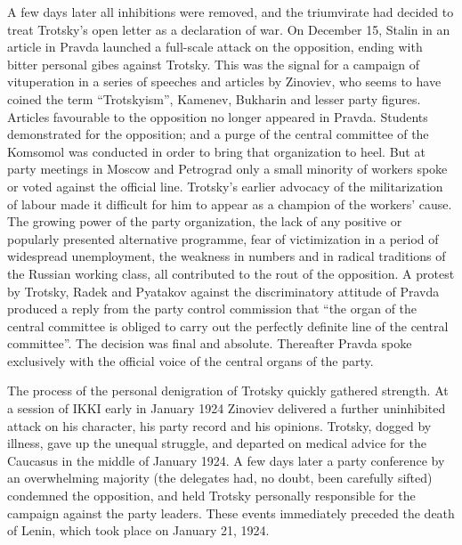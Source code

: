 A few days later all inhibitions were removed, and the triumvirate had decided to treat Trotsky's open letter as a declaration of war. On December 15, Stalin in an article in Pravda launched a full-scale attack on the opposition, ending with bitter personal gibes against Trotsky. This was the signal for a campaign of vituperation in a series of speeches and articles by Zinoviev, who seems to have coined the term ``Trotskyism'', Kamenev, Bukharin and lesser party figures. Articles favourable to the opposition no longer appeared in Pravda. Students demonstrated for the opposition; and a purge of the central committee of the Komsomol was conducted in order to bring that organization to heel. But at party meetings in Moscow and Petrograd only a small minority of workers spoke or voted against the official line. Trotsky's earlier advocacy of the militarization of labour made it difficult for him to appear as a champion of the workers' cause. The growing power of the party organization, the lack of any positive or popularly presented alternative programme, fear of victimization in a period of widespread unemployment, the weakness in numbers and in radical traditions of the Russian working class, all contributed to the rout of the opposition. A protest by Trotsky, Radek and Pyatakov against the discriminatory attitude of Pravda produced a reply from the party control commission that ``the organ of the central committee is obliged to carry out the perfectly definite line of the central committee''. The decision was final and absolute. Thereafter Pravda spoke exclusively with the official voice of the central organs of the party. 

The process of the personal denigration of Trotsky quickly gathered strength. At a session of IKKI early in January 1924 Zinoviev delivered a further uninhibited attack on his character, his party record and his opinions. Trotsky, dogged by illness, gave up the unequal struggle, and departed on medical advice for the Caucasus in the middle of January 1924. A few days later a party conference by an overwhelming majority (the delegates had, no doubt, been carefully sifted) condemned the opposition, and held Trotsky personally responsible for the campaign against the party leaders. These events immediately preceded the death of Lenin, which took place on January 21, 1924.